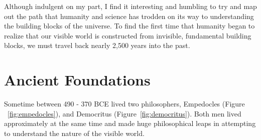 Although indulgent on my part, I find it interesting and humbling to try and map
out the path that humanity and science has trodden on its way to understanding
the building blocks of the universe. To find the first time that humanity began
to realize that our visible world is constructed from invisible, fundamental
building blocks, we must travel back nearly 2,500 years into the past.

\section{Ancient Foundations} 

Sometime between 490 - 370 BCE lived two philosophers, Empedocles (Figure
~\ref{fig:empedocles}), and Democritus (Figure~\ref{fig:democritus}). Both men
lived approximately at the same time and made huge philosophical leaps in
attempting to understand the nature of the visible world.

